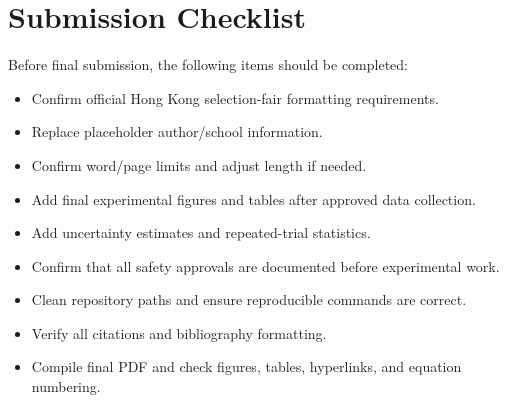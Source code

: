 \section{Submission Checklist}

Before final submission, the following items should be completed:
\begin{itemize}
    \item Confirm official Hong Kong selection-fair formatting requirements.
    \item Replace placeholder author/school information.
    \item Confirm word/page limits and adjust length if needed.
    \item Add final experimental figures and tables after approved data collection.
    \item Add uncertainty estimates and repeated-trial statistics.
    \item Confirm that all safety approvals are documented before experimental work.
    \item Clean repository paths and ensure reproducible commands are correct.
    \item Verify all citations and bibliography formatting.
    \item Compile final PDF and check figures, tables, hyperlinks, and equation numbering.
\end{itemize}
